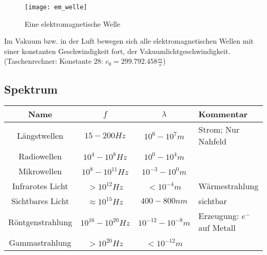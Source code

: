 \begin{figure}[h!]
	\center
	\texttt{[image: em\_welle]}
	\caption{Eine elektromagnetische Welle}
	\label{fig:emwelle}
\end{figure}

Im Vakuum bzw. in der Luft bewegen sich alle elektromagnetischen Wellen mit einer konstanten Geschwindigkeit fort, der Vakuumlichtgeschwindigkeit. (Taschenrechner: Konstante 28: $c_0=299.792.458 \frac{m}{s}$)

\subsection{Spektrum}
\hspace*{-25pt}
\begin{tabular}[c]{|c|c|c|l|}
	\hline
	Name				&	$f$						& $\lambda$ 	& Kommentar\\
	\hline
	Längstwellen		&	$15-200Hz$				& $10^6-10^7m$ & Strom; Nur Nahfeld\\
	Radiowellen			&	$10^4-10^8Hz$			& $10^0-10^4m$ & \\
	Mikrowellen			&	$10^8-10^{11}Hz$		& $10^{-3}-10^{0}m$ & \\
	Infrarotes Licht	&	$>10^{12}Hz$			& $<10^{-4}m$ & \glqq Wärmestrahlung\grqq \\
	Sichtbares Licht	&	$\approx 10^{15}Hz$		& $400-800nm$ & sichtbar\\
	Röntgenstrahlung	&	$10^{16} - 10^{20}Hz$	& $10^{-12}-10^{-8}m$ & Erzeugung: $e^{-}$ auf Metall \\
	Gammastrahlung		&	$>10^{20}Hz$			& $<10^{-12}m$ & \\
	\hline
\end{tabular}










